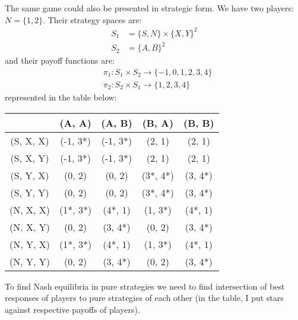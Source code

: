 \documentclass[]{article}
\begin{document}
\begin{enumerate}[label=(\roman*)]
\begin{figure}[h]
\begin{center}
		\end{center}
	\end{figure}
	The same game could also be presented in strategic form. We have two players: $N = \{1, 2\}$. Their strategy spaces are:
	\begin{equation}
		\begin{split}
		S_1& = \{S, N\}\times\{X, Y\}^2\\\nonumber
		S_2& = \{A, B\}^2
		\end{split}
	\end{equation}
	and their payoff functions are:
	\begin{equation}
	\begin{split}
		&\pi_1: S_1\times S_2 \longrightarrow \{-1, 0, 1, 2, 3, 4\}\\\nonumber
		&\pi_2: S_2\times S_1 \longrightarrow \{1, 2, 3, 4\}
	\end{split}
	\end{equation}
	represented in the table below:
	\begin{table}[h]
		\centering
		\begin{tabular}{c|c|c|c|c}
						& (A, A) 	& (A, B) 	& (B, A) & (B, B) \\
			\hline
			(S, X, X) 	& (-1, 3*) 	& (-1, 3*) 	& (2, 1) & (2, 1) \\
			(S, X, Y) 	& (-1, 3*) 	& (-1, 3*) 	& (2, 1) & (2, 1) \\
			(S, Y, X) 	& (0, 2) 	& (0, 2) 	& (3*, 4*)& (3, 4*) \\
			(S, Y, Y) 	& (0, 2) 	& (0, 2) 	& (3*, 4*)& (3, 4*) \\
			(N, X, X)	& (1*, 3*) 	& (4*, 1) 	& (1, 3*) & (4*, 1) \\
			(N, X, Y) 	& (0, 2)	& (3, 4*) 	& (0, 2) & (3, 4*) \\
			(N, Y, X) 	& (1*, 3*) 	& (4*, 1) 	& (1, 3*) & (4*, 1) \\
			(N, Y, Y) 	& (0, 2)	& (3, 4*) 	& (0, 2) & (3, 4*)
		\end{tabular}
	\end{table}
	To find Nash equilibria in pure strategies we need to find intersection of best responses of players to pure strategies of each other (in the table, I put stars against respective payoffs of players). 

\end{enumerate}
\end{document}
